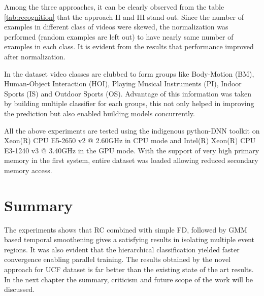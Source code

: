 Among the three approaches, it can be clearly observed from the table \ref{tab:recognition} that the approach II and III  stand out.  Since the number of examples in different class of videos were skewed, the normalization was performed (random examples are left out) to have nearly same number of examples in each class.  It is evident from the results that performance improved after normalization.
\par In the dataset video classes are clubbed to form groups like Body-Motion (BM), Human-Object Interaction (HOI), Playing Musical Instruments (PI), Indoor Sports (IS) and Outdoor Sports (OS). Advantage of this information was taken by building multiple classifier for each groups, this not only helped in improving the prediction but also enabled building models concurrently.

\par All the above experiments are tested using the indigenous python-DNN toolkit on  Xeon(R) CPU E5-2650 v2 @ 2.60GHz in CPU mode and Intel(R) Xeon(R) CPU E3-1240 v3 @ 3.40GHz in the GPU mode. With the support of very high primary memory in  the first system, entire dataset was loaded allowing reduced secondary memory access.

\section{Summary}
The experiments shows that RC combined with simple FD,  followed by GMM based temporal smoothening gives a satisfying results in isolating multiple event regions.  It was also evident that the  hierarchical classification yielded  faster convergence enabling parallel training.  The results obtained by the novel approach  for UCF dataset is far better than the existing state of the art results.  In the next chapter the summary, criticism and future scope of the work will be discussed.